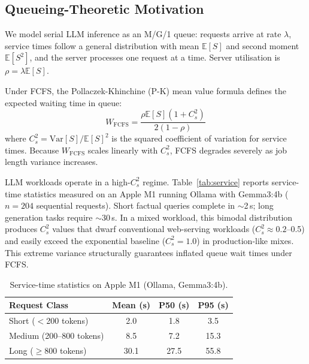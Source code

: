 \documentclass[10pt]{article}
\begin{document}
\subsection{Queueing-Theoretic Motivation}
\label{sec:queueing}

We model serial LLM inference as an M/G/1 queue: requests arrive at rate $\lambda$, service times follow a general distribution with mean $\mathbb{E}[S]$ and second moment $\mathbb{E}[S^2]$, and the server processes one request at a time. Server utilisation is $\rho = \lambda \mathbb{E}[S]$.

Under FCFS, the Pollaczek-Khinchine (P-K) mean value formula defines the expected waiting time in queue:
\begin{equation}
W_{\text{FCFS}} = \frac{\rho \mathbb{E}[S](1 + C_s^2)}{2(1-\rho)}
\end{equation}
where $C_s^2 = \text{Var}[S]/\mathbb{E}[S]^2$ is the squared coefficient of variation for service times. Because $W_{\text{FCFS}}$ scales linearly with $C_s^2$, FCFS degrades severely as job length variance increases.

LLM workloads operate in a high-$C_s^2$ regime. Table~\ref{tab:service} reports service-time statistics measured on an Apple M1 running Ollama with Gemma3:4b ($n=204$ sequential requests). Short factual queries complete in $\sim$2\,s; long generation tasks require $\sim$30\,s. In a mixed workload, this bimodal distribution produces $C_s^2$ values that dwarf conventional web-serving workloads ($C_s^2 \approx 0.2$–0.5) and easily exceed the exponential baseline ($C_s^2 = 1.0$) in production-like mixes. This extreme variance structurally guarantees inflated queue wait times under FCFS.

\begin{table}[H]
\centering
\caption{Service-time statistics on Apple M1 (Ollama, Gemma3:4b).}
\label{tab:service}
\label{tab:variance}
\small
\begin{tabular}{lccc}
\toprule
Request Class & Mean (s) & P50 (s) & P95 (s) \\
\midrule
Short ($<$200 tokens) & 2.0 & 1.8 & 3.5 \\
Medium (200–800 tokens) & 8.5 & 7.2 & 15.3 \\
Long ($\geq$800 tokens) & 30.1 & 27.5 & 55.8 \\
\bottomrule
\end{tabular}
\end{table}
\end{document}
